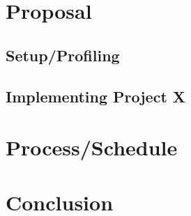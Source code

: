 \documentclass{article}
\begin{document}
\section*{Proposal}

\subsection*{Setup/Profiling}


\subsection*{Implementing Project X}



\section*{Process/Schedule}

\section*{Conclusion}




\end{document}
